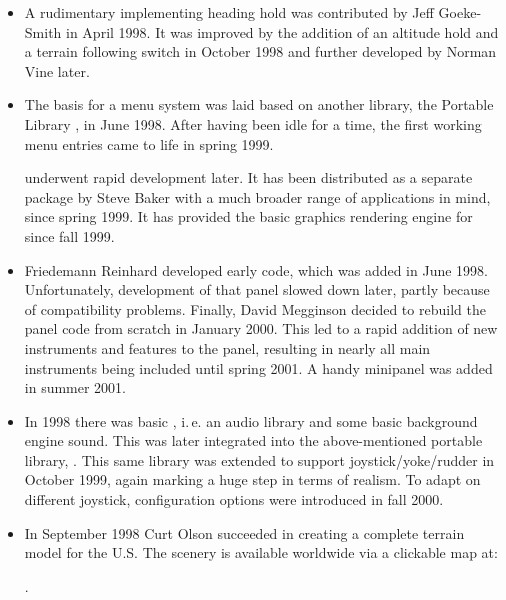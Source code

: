 \begin{itemize}
\item A rudimentary  implementing heading hold was
contributed by Jeff Goeke-Smith in April 1998. It was improved
by the addition of an altitude hold and a terrain following switch in October 1998 and
further developed by Norman Vine later.

\item The basis for a menu system was laid based on another library,
 the Portable Library \PLIB{}, in June 1998. After having been idle for a time, the first
 working menu entries came to life in spring 1999.

  \PLIB{} underwent rapid development later. It has been distributed as a separate package by
  Steve Baker with a much broader range of applications in mind, since spring 1999. It
  has provided the basic graphics rendering engine for \FlightGear{} since fall 1999.

\item Friedemann Reinhard 
 developed early  code, which was added in June 1998. Unfortunately,
 development of that panel slowed down later, partly because of  compatibility
 problems. Finally, David Megginson  decided to rebuild the panel code from scratch in January 2000. This led to a rapid
  addition of new instruments and features to the panel, resulting in nearly all main
  instruments being included until spring 2001. A handy minipanel was added in summer 2001.

\item In 1998 there was basic , i.\,e. an audio library
and some basic background engine sound. This was later integrated into the
above-mentioned portable library, \PLIB{}. This same library was extended to
support joystick/yoke/rudder in October 1999, again marking a huge step
in terms of realism. To adapt on different joystick, configuration options were
introduced in fall 2000.

\item In September 1998 Curt Olson
 succeeded in creating a complete terrain model for the U.S. The
  scenery is available worldwide via a clickable map  at:
   \medskip

.
 \medskip


\end{itemize}
